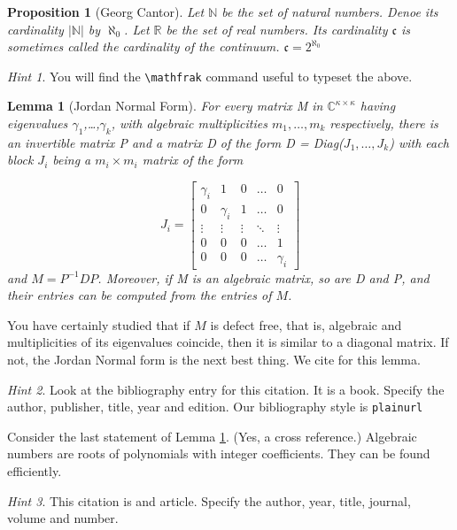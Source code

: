 \documentclass{article}
\newtheorem{lemma}{Lemma}
\newtheorem{proposition}{Proposition}[section]
\theoremstyle{remark}
\newtheorem*{hint}{Hint}
\begin{document}
\begin{proposition}[Georg Cantor]
    Let $\mathbb{N}$ be the set of natural numbers. Denoe its cardinality $|\mathbb{N}|$ by $\aleph _0$. Let 
    $\mathbb{R}$ be the set of real numbers. Its cardinality $\mathfrak{c}$ is sometimes called the cardinality
    of the continuum. $\mathfrak{c}=2^{\aleph_0}$
\end{proposition}

\begin{hint}
    You will find the \verb!\mathfrak! command useful to typeset the above.
\end{hint}

\begin{lemma}[Jordan Normal Form]
    \label{lemma}
    For every matrix M in $\mathbb{C}^{\kappa \times \kappa}$ having eigenvalues $\gamma_1$,\dots,$\gamma_k$,
    with algebraic multiplicities $m_1,\dots,m_k$ respectively, there is an invertible matrix
    P and a matrix D of the form D = Diag($J_1,\dots,J_k$) with each block $J_i$ being a $m_i \times m_i$ matrix of the form

    \begin{equation*}
        J_i = \begin{bmatrix}
            \gamma_i & 1 & 0 & \dots & 0 \\
            0 & \gamma_i & 1 & \dots & 0 \\
            \vdots & \vdots & \vdots & \ddots & \vdots \\
            0 & 0 & 0 & \dots & 1 \\
            0 & 0 & 0 & \dots & \gamma_i
        \end{bmatrix}
    \end{equation*}
    and $M=P^{-1}DP$. Moreover, if M is an algebraic matrix, so are D and P, and 
    their entries can be computed from the entries of $M$.
\end{lemma}
    
You have certainly studied that if $M$ is defect free, that is, algebraic and multiplicities
of its eigenvalues coincide, then it is similar to a diagonal matrix. If not,
the Jordan Normal form is the next best thing. We cite \cite{linalg} for this lemma.

\begin{hint}
    Look at the bibliography entry for this citation. It is a book. Specify the author,
    publisher, title, year and edition. Our bibliography style is \verb!plainurl!
\end{hint}

Consider the last statement of Lemma \ref{lemma}. (Yes, a cross reference.) Algebraic numbers
are roots of polynomials with integer coefficients. They can be found efficiently.\cite{cite2}

\begin{hint}
    This citation is and article. Specify the author, year, title, journal, volume and number.
\end{hint}



\end{document}
